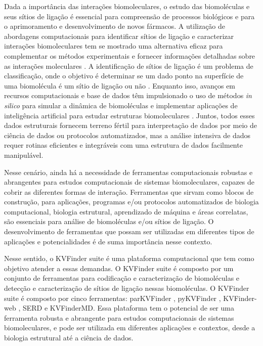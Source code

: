 \documentclass[Portugues]{phdquali}
\begin{document}
Dada a importância das interações biomoleculares, o estudo das biomoléculas e seus sítios de ligação é essencial para compreensão de processos biológicos e para o aprimoramento e desenvolvimento de novos fármacos. A utilização de abordagens computacionais para identificar sítios de ligação e caracterizar interações biomoleculares tem se mostrado uma alternativa eficaz para complementar os métodos experimentais e fornecer informações detalhadas sobre as interações moleculares \cite{simoes2017}. A identificação de sítios de ligação é um problema de classificação, onde o objetivo é determinar se um dado ponto na superfície de uma biomolécula é um sítio de ligação ou não \cite{sotriffer2002,henrich2010,simoes2017}. Enquanto isso, avanços em recursos computacionais e base de dados têm impulsionado o uso de métodos \textit{in silico} para simular a dinâmica de biomoléculas e implementar aplicações de inteligência artificial para estudar estruturas biomoleculares \cite{tunyasuvunakool2021}. Juntos, todos esses dados estruturais fornecem terreno fértil para interpretação de dados por meio de ciência de dados ou protocolos automatizados, mas a análise intensiva de dados requer rotinas eficientes e integráveis com uma estrutura de dados facilmente manipulável.

Nesse cenário, ainda há a necessidade de ferramentas computacionais robustas e abrangentes para estudos computacionais de sistemas biomoleculares, capazes de cobrir as diferentes formas de interação. Ferramentas que sirvam como blocos de construção, para aplicações, programas e/ou protocolos automatizados de biologia computacional, biologia estrutural, aprendizado de máquina e áreas correlatas, são essenciais para análise de biomoléculas e/ou sítios de ligação. O desenvolvimento de ferramentas que possam ser utilizadas em diferentes tipos de aplicações e potencialidades é de suma importância nesse contexto.

Nesse sentido, o KVFinder suite é uma plataforma computacional que tem como objetivo atender a essas demandas. O KVFinder suite é composto por um conjunto de ferramentas para codificação e caracterização de biomoléculas e detecção e caracterização de sítios de ligação nessas biomoléculas. O KVFinder suite é composto por cinco ferramentas: parKVFinder \cite{guerra2020}, pyKVFinder \cite{guerra2021}, KVFinder-web \cite{guerra2023A}, SERD e KVFinderMD. Essa plataforma tem o potencial de ser uma ferramenta robusta e abrangente para estudos computacionais de sistemas biomoleculares, e pode ser utilizada em diferentes aplicações e contextos, desde a biologia estrutural até a ciência de dados.
\end{document}
